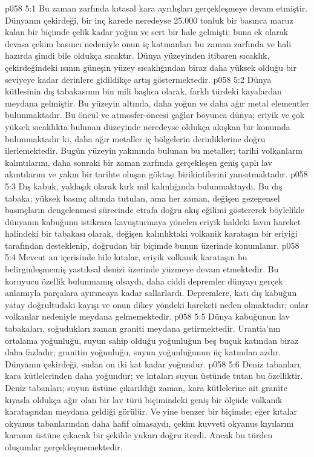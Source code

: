 \vs p058 5:1 Bu zaman zarfında kıtasal kara ayrılışları gerçekleşmeye devam etmiştir. Dünyanın çekirdeği, bir inç karede neredeyse 25.000 tonluk bir basınca maruz kalan bir biçimde çelik kadar yoğun ve sert bir hale gelmişti; buna ek olarak devasa çekim basıncı nedeniyle onun iç katmanları bu zaman zarfında ve hali hazırda şimdi bile oldukça sıcaktır. Dünya yüzeyinden itibaren sıcaklık, çekirdeğindeki ısının güneşin yüzey sıcaklığından biraz daha yüksek olduğu bir seviyeye kadar derinlere gidildikçe artış göstermektedir.
\vs p058 5:2 Dünya kütlesinin dış tabakasının bin mili başlıca olarak, farklı türdeki kayalardan meydana gelmiştir. Bu yüzeyin altında, daha yoğun ve daha ağır metal elementler bulunmaktadır. Bu öncül ve atmosfer\hyp{}öncesi çağlar boyunca dünya; eriyik ve çok yüksek sıcaklıkta bulunan düzeyinde neredeyse oldukça akışkan bir konumda bulunmaktadır ki, daha ağır metaller iç bölgelerin derinliklerine doğru ilerlemektedir. Bugün yüzeyin yakınında bulunan bu metaller; tarihi volkanların kalıntılarını, daha sonraki bir zaman zarfında gerçekleşen geniş çaplı lav akıntılarını ve yakın bir tarihte oluşan göktaşı birikintilerini yansıtmaktadır.
\vs p058 5:3 Dış kabuk, yaklaşık olarak kırk mil kalınlığında bulunmaktaydı. Bu dış tabaka; yüksek basınç altında tutulan, ama her zaman, değişen gezegensel basınçların dengelenmesi sürecinde etrafa doğru akış eğilimi göstererek böylelikle dünyanın kabuğunu istikrara kavuşturmaya yönelen eriyik haldeki lavın hareket halindeki bir tabakası olarak, değişen kalınlıktaki volkanik karataşın bir eriyiği tarafından desteklenip, doğrudan bir biçimde bunun üzerinde konumlanır.
\vs p058 5:4 Mevcut an içerisinde bile kıtalar, eriyik volkanik karataşın bu belirginleşmemiş yastıksal denizi üzerinde yüzmeye devam etmektedir. Bu koruyucu özellik bulunmamış olsaydı, daha ciddi depremler dünyayı gerçek anlamıyla parçalara ayırıncaya kadar sallarlardı. Depremlere, katı dış kabuğun yatay doğrultudaki kayışı ve onun dikey yöndeki hareketi neden olmaktadır; onlar volkanlar nedeniyle meydana gelmemektedir.
\vs p058 5:5 Dünya kabuğunun lav tabakaları, soğudukları zaman graniti meydana getirmektedir. Urantia’nın ortalama yoğunluğu, suyun sahip olduğu yoğunluğun beş buçuk katından biraz daha fazladır; granitin yoğunluğu, suyun yoğunluğunun üç katından azdır. Dünyanın çekirdeği, sudan on iki kat kadar yoğundur.
\vs p058 5:6 Deniz tabanları, kara kütlelerinden daha yoğundur; ve kıtaları suyun üstünde tutan bu özelliktir. Deniz tabanları; suyun üstüne çıkarıldığı zaman, kara kütlelerine ait granite kıyasla oldukça ağır olan bir lav türü biçimindeki geniş bir ölçüde volkanik karataşından meydana geldiği görülür. Ve yine benzer bir biçimde; eğer kıtalar okyanus tabanlarından daha hafif olmasaydı, çekim kuvveti okyanus kıyılarını karanın üstüne çıkacak bir şekilde yukarı doğru iterdi. Ancak bu türden oluşumlar gerçekleşmemektedir.
